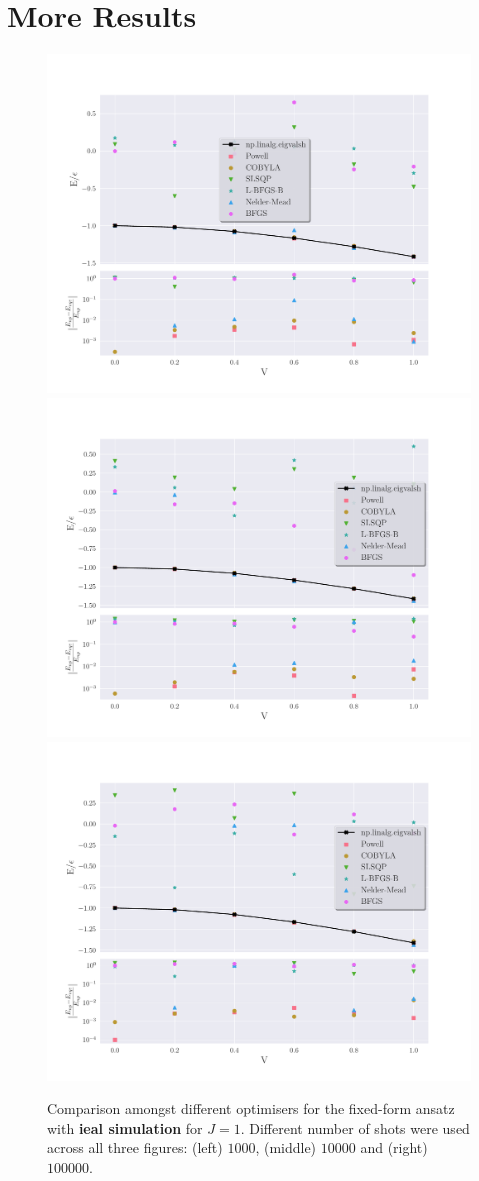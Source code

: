 \chapter{More Results}

\begin{figure}[h]
	\centering
	\includegraphics[width=0.32\linewidth]{image/lipkin_result/vqe-opt/cmp_opt_vqe_ee1000_J=1.pdf}
	\includegraphics[width=0.32\linewidth]{image/lipkin_result/vqe-opt/cmp_opt_vqe_ee10000_J=1.pdf}
	\includegraphics[width=0.32\linewidth]{image/lipkin_result/vqe-opt/cmp_opt_vqe_ee100000_J=1.pdf}
	\caption{Comparison amongst different optimisers for the fixed-form ansatz with \textbf{ieal simulation} for $ J=1 $. Different number of shots were used across all three figures: (left) $ 1000 $, (middle) $ 10000 $ and (right) $ 100000 $.}
	\label{fig:OptHW1}
\end{figure}

